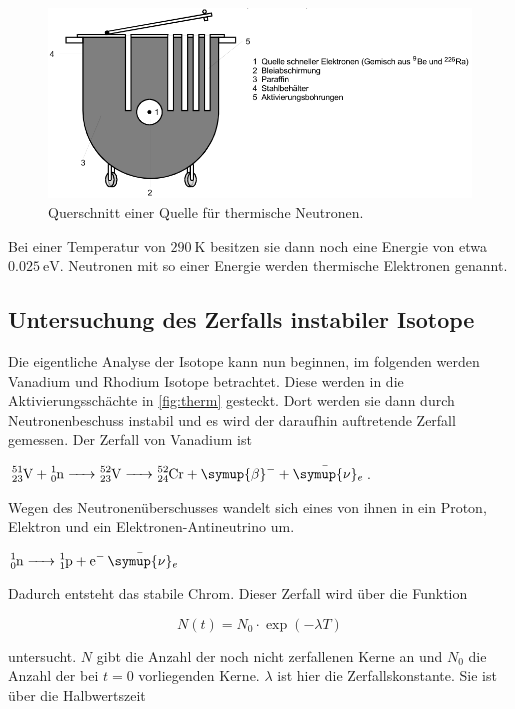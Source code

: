 \begin{figure}
    \centering
    \includegraphics[width=\textwidth]{images/bild1.png}
    \caption{Querschnitt einer Quelle für thermische Neutronen.}
    \label{fig:therm}
\end{figure}

Bei einer Temperatur von $\SI{290}{\kelvin}$ besitzen sie dann noch eine Energie von etwa $\SI{0.025}{\electronvolt}$.
Neutronen mit so einer Energie werden thermische Elektronen genannt.

\subsection{Untersuchung des Zerfalls instabiler Isotope}
\label{ssec:t4}

Die eigentliche Analyse der Isotope kann nun beginnen, im folgenden werden Vanadium und Rhodium Isotope betrachtet.
Diese werden in die Aktivierungsschächte in \autoref{fig:therm} gesteckt.
Dort werden sie dann durch Neutronenbeschuss instabil und es wird der daraufhin auftretende Zerfall gemessen.
Der Zerfall von Vanadium ist

$\ce{^{51}_{23}V + ^{1}_0n -> ^{52}_{23}V -> ^{52}_{24}Cr + \symup{\beta}- + \bar{\symup{\nu}}_e}$.

Wegen des Neutronenüberschusses wandelt sich eines von ihnen in ein Proton, Elektron und ein Elektronen-Antineutrino um.

$\ce{^{1}_0n -> ^{1}_1p + e- \bar{\symup{\nu}}_e}$

Dadurch entsteht das stabile Chrom.
Dieser Zerfall wird über die Funktion 

\begin{equation}
    N \left(t\right) = N_0 \cdot \exp(-\lambda T)
    \label{eq:zerfall}
\end{equation}

untersucht.
$N$ gibt die Anzahl der noch nicht zerfallenen Kerne an und $N_0$ die Anzahl der bei $t = 0$ vorliegenden Kerne.
$\lambda$ ist hier die Zerfallskonstante.
Sie ist über die Halbwertszeit 

